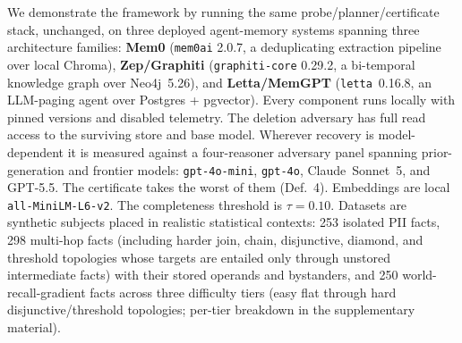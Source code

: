 \documentclass[letterpaper]{article}
\begin{document}
We demonstrate the framework by running the same probe/planner/certificate stack,
unchanged, on three deployed agent-memory systems spanning three architecture
families: \textbf{Mem0} \citep{mem0} (\texttt{mem0ai} 2.0.7, a deduplicating
extraction pipeline over local Chroma), \textbf{Zep/Graphiti}
\citep{rasmussen2025zep} (\texttt{graphiti-core} 0.29.2, a bi-temporal knowledge
graph over Neo4j~5.26), and \textbf{Letta/MemGPT} \citep{packer2024memgpt}
(\texttt{letta}~0.16.8, an LLM-paging agent over Postgres + pgvector). Every
component runs locally with pinned versions and disabled telemetry. The deletion
adversary has full read access to the surviving store and base model. 
Wherever recovery is model-dependent it is measured against
a four-reasoner adversary panel spanning prior-generation and frontier models: %
\texttt{gpt-4o-mini}, \texttt{gpt-4o}, Claude~Sonnet~5, and GPT-5.5. The
certificate takes the worst of them (Def.~4). Embeddings are local \texttt{all-MiniLM-L6-v2}. 
The completeness threshold is $\tau=0.10$. Datasets are
synthetic subjects placed in realistic statistical contexts: 253 isolated PII facts,
298 multi-hop facts (including harder join, chain, disjunctive, diamond, and
threshold topologies whose targets are entailed only through unstored
intermediate facts) with their stored operands and bystanders, and 250
world-recall-gradient facts across three difficulty tiers (easy flat through hard
disjunctive/threshold topologies; per-tier breakdown in the supplementary material).
\end{document}
